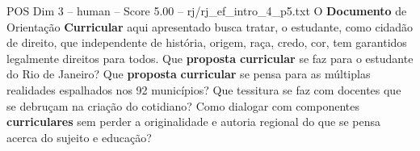 \begin{textsample}{POS Dim 3 – human – Score 5.00 – rj/rj\_ef\_intro\_4\_p5.txt}  \label{ex:f3_pos_013}
O \textbf{Documento} de Orientação \textbf{Curricular} aqui apresentado busca tratar, o estudante, como cidadão de direito, que independente de história, origem, raça, credo, cor, tem garantidos legalmente direitos para todos.
Que \textbf{proposta} \textbf{curricular} se faz para o estudante do Rio de Janeiro?
Que \textbf{proposta} \textbf{curricular} se pensa para as múltiplas realidades espalhados nos 92 municípios?
Que tessitura se faz com docentes que se debruçam na criação do cotidiano?
Como dialogar com componentes \textbf{curriculares} sem perder a originalidade e autoria regional do que se pensa acerca do sujeito e educação?

\end{textsample}
